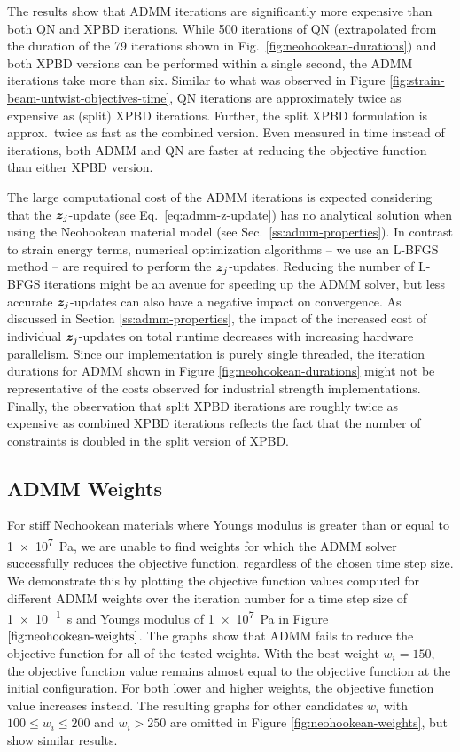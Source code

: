 The results show that ADMM iterations are significantly more expensive than both QN and XPBD iterations. While 500 iterations of QN (extrapolated from the duration of the 
79 iterations shown in Fig.\ \ref{fig:neohookean-durations}) and both XPBD versions can be performed within a single second, the ADMM iterations take more than six. 
Similar to what was observed in Figure \ref{fig:strain-beam-untwist-objectives-time}, QN iterations are approximately twice as expensive as (split) XPBD iterations.
Further, the split XPBD formulation is approx.\ twice as fast as the combined version. Even measured in time instead of iterations, both ADMM and QN are faster at 
reducing the objective function than either XPBD version.

The large computational cost of the ADMM iterations is expected considering that the $\bm{z}_j$-update (see Eq.\ \ref{eq:admm-z-update}) has no analytical solution when using the 
Neohookean material model (see Sec.\ \ref{ss:admm-properties}). In contrast to strain energy terms, numerical optimization algorithms -- we use an L-BFGS method -- are required to 
perform the $\bm{z}_j$-updates. Reducing the number of L-BFGS iterations might be an avenue for speeding up the ADMM solver, but less accurate $\bm{z}_j$-updates can also have a 
negative impact on convergence. As discussed in Section \ref{ss:admm-properties}, the impact of the increased cost of individual $\bm{z}_j$-updates on total runtime decreases with 
increasing hardware parallelism. Since our implementation is purely single threaded, the iteration durations for ADMM shown in Figure \ref{fig:neohookean-durations} might not be 
representative of the costs observed for industrial strength implementations. Finally, the observation that split XPBD iterations are roughly twice as expensive as combined XPBD 
iterations reflects the fact that the number of constraints is doubled in the split version of XPBD.

\subsection{ADMM Weights}\label{ss:neohookean-admm-weights}
For stiff Neohookean materials where Youngs modulus is greater than or equal to \SI{1e7}{\pascal}, we are unable to find weights for which the ADMM solver successfully reduces the 
objective function, regardless of the chosen time step size. We demonstrate this by plotting the objective function values computed for different ADMM weights over the iteration 
number for a time step size of \SI{1e-1}{\second} and Youngs modulus of \SI{1e7}{\pascal} in Figure $\ref{fig:neohookean-weights}$. The graphs show that ADMM fails to reduce the 
objective function for all of the tested weights. With the best weight $w_i = 150$, the objective function value remains almost equal to the objective function at the 
initial configuration. For both lower and higher weights, the objective function value increases instead. The resulting graphs for other candidates $w_i$ with $100 \leq w_i \leq 
200$ and $w_i > 250$ are omitted in Figure \ref{fig:neohookean-weights}, but show similar results.

